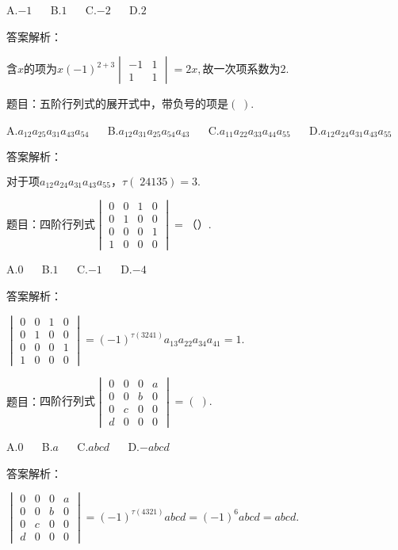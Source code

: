 A.$-1$ $\quad$ B.$1$ $\quad$ C.$-2$ $\quad$ D.$2$

答案解析：

$含x\mathrm{的项为}x(-1)^{2+3}\begin{vmatrix}-1&1\\1&1\end{vmatrix}=2x,\mathrm{故一次项系数为}2.$



题目：$\mathrm{五阶行列式的展开式中}，\mathrm{带负号的项是}(\;).$

A.$a_{12}a_{25}a_{31}a_{43}a_{54}$ $\quad$ B.$a_{12}a_{31}a_{25}a_{54}a_{43}$ $\quad$ C.$a_{11}a_{22}a_{33}a_{44}a_{55}$ $\quad$ D.$a_{12}a_{24}a_{31}a_{43}a_{55}$

答案解析：

$\mathrm{对于项}a_{12}a_{24}a_{31}a_{43}a_{55}，\tau(\;24135)=3.$



题目：$\mathrm{四阶行列式}\begin{vmatrix}0&0&1&0\\0&1&0&0\\0&0&0&1\\1&0&0&0\end{vmatrix}=（）.$

A.$0$ $\quad$ B.$1$ $\quad$ C.$-1$ $\quad$ D.$-4$

答案解析：

$\begin{vmatrix}0&0&1&0\\0&1&0&0\\0&0&0&1\\1&0&0&0\end{vmatrix}=(-1)^{\tau(3241)}a_{13}a_{22}a_{34}a_{41}=1.$



题目：$\mathrm{四阶行列式}\begin{vmatrix}0&0&0&a\\0&0&b&0\\0&c&0&0\\d&0&0&0\end{vmatrix}=(\;).$

A.$0$ $\quad$ B.$a$ $\quad$ C.$abcd$ $\quad$ D.$-abcd$

答案解析：

$\begin{vmatrix}0&0&0&a\\0&0&b&0\\0&c&0&0\\d&0&0&0\end{vmatrix}=(-1)^{\tau(4321)}abcd=(-1)^6abcd=abcd.$



